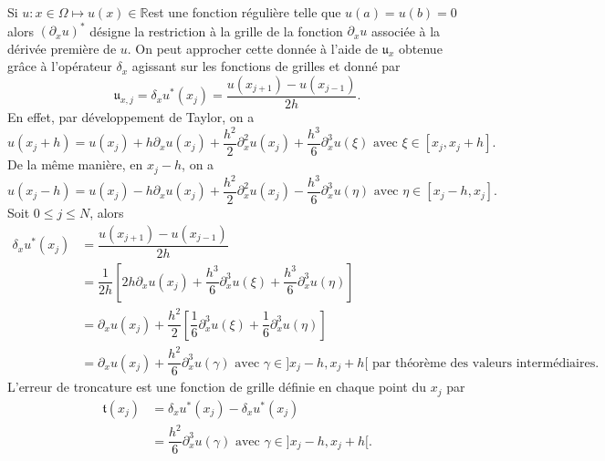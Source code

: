 Si $u : x \in \Omega \mapsto u(x) \in \mathbb{R}$est une fonction régulière telle que $u(a) = u(b) = 0$ alors $(\partial_x u)^*$ désigne la restriction à la grille de la fonction $\partial_x u$ associée à la dérivée première de $u$. On peut approcher cette donnée à l'aide de $\mathfrak{u}_x$ obtenue grâce à l'opérateur $\delta_x$ agissant sur les fonctions de grilles et donné par
\begin{equation}
\mathfrak{u}_{x,j} = \delta_x u^*(x_j) = \dfrac{u(x_{j+1}) - u(x_{j-1})}{2h}.
\end{equation}
En effet, par développement de Taylor, on a 
\begin{equation}
u(x_j+h) = u(x_j) + h \partial_x u(x_j) + \dfrac{h^2}{2} \partial_x^2 u(x_j) + \dfrac{h^3}{6} \partial_x^3 u(\xi) \text{ avec } \xi \in [x_j, x_j+h].
\end{equation}
De la même manière, en $x_j-h$, on a 
\begin{equation}
u(x_j-h) = u(x_j) - h \partial_x u(x_j) + \dfrac{h^2}{2} \partial_x^2 u(x_j) - \dfrac{h^3}{6} \partial_x^3 u(\eta) \text{ avec } \eta \in [x_j-h, x_j].
\end{equation}
Soit $0 \leq j \leq N$, alors
\begin{align*}
\delta_x u^*(x_j) & = \dfrac{u(x_{j+1}) - u(x_{j-1})}{2h}\\
                  & = \dfrac{1}{2h} \left[ 2h \partial_x u(x_j) + \dfrac{h^3}{6} \partial_x^3 u(\xi) + \dfrac{h^3}{6} \partial_x^3 u(\eta) \right]\\
                  & = \partial_x u(x_j) + \dfrac{h^2}{2} \left[ \dfrac{1}{6} \partial_x^3 u(\xi) + \dfrac{1}{6} \partial_x^3 u(\eta) \right] \\
                  & = \partial_x u(x_j) + \dfrac{h^2}{6} \partial_x^3 u(\gamma) \text{ avec } \gamma \in ]x_j-h , x_j+h[ \text{ par théorème des valeurs intermédiaires.}
\end{align*}
L'erreur de troncature est une fonction de grille définie en chaque point du $x_j$ par
\begin{align*}
\mathfrak{t}(x_j) & = \delta_x u^*(x_j) - \delta_x u^*(x_j)\\
                  & = \dfrac{h^2}{6} \partial_x^3 u(\gamma) \text{ avec } \gamma \in ]x_j-h , x_j+h[.
\end{align*}


















